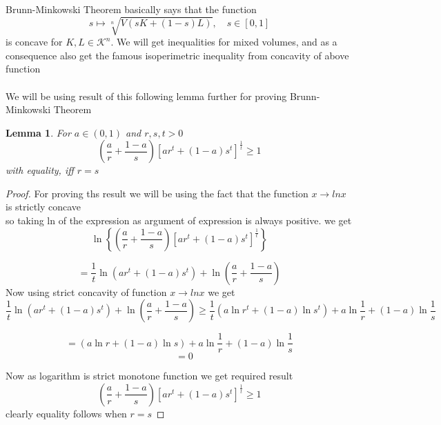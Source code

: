 \documentclass[oneside]{book}
\newtheorem{lemma}[theorem]{Lemma}
\theoremstyle{definition}
\begin{document}
 Brunn-Minkowski Theorem  basically says that the function 
 \[s  \mapsto \sqrt[n]{V(s K+(1- s) L)}, \quad s \in[0,1]
\]
 is concave for $ K, L \in \mathcal{K}^n $.
We will get inequalities for mixed volumes, and as a consequence also get the famous isoperimetric inequality from concavity of above function
\\\\
We will be using result of this following lemma further for proving Brunn-Minkowski Theorem
\begin{lemma} 
\label{l:1}
For $a \in(0,1)$ and $r, s, t>0$
\[
\left(\frac{a}{r}+\frac{1-a}{s}\right)\left[a r^{t}+(1-a) s^{t}\right]^{\frac{1}{t}} \geq 1
\]
with equality, iff $r=s$
\end{lemma} 
 \begin{proof}
 
 For proving ths result we will be using the fact that the function $x \rightarrow lnx $ is strictly concave \\
 so taking ln of the expression as argument of expression is always positive. we get 
 $$\ln \left\{\left(\frac{a}{r}+\frac{1-a}{s}\right)\left[a r^{t}+(1-a) s^{t}\right]^{\frac{1}{t}}\right\}$$
 
$$ =\frac{1}{t} \ln \left(a r^{t}+(1-a) s^{t}\right)+\ln \left(\frac{a}{r}+\frac{1-a}{s}\right)$$
Now using strict concavity of  function  $x \rightarrow lnx $ we get 
$$\frac{1}{t} \ln \left(a r^{t}+(1-a) s^{t}\right)+\ln \left(\frac{a}{r}+\frac{1-a}{s}\right)
  \geq \frac{1}{t}\left(a \ln r^{t}+(1-a) \ln s^{t}\right)+a \ln \frac{1}{r}+(1-a) \ln \frac{1}{s}$$
  
  
$$ =  \left(a \ln r+(1-a) \ln s\right)+a \ln \frac{1}{r}+(1-a) \ln \frac{1}{s}$$
$$\quad = 0$$
 
 Now as logarithm is strict monotone function we get required result 
 \[
\left(\frac{a}{r}+\frac{1-a}{s}\right)\left[a r^{t}+(1-a) s^{t}\right]^{\frac{1}{t}} \geq 1
\]
 clearly equality follows when $r = s $
 \end{proof}
 
 
 
 
 
 
 
 
 
\end{document}
